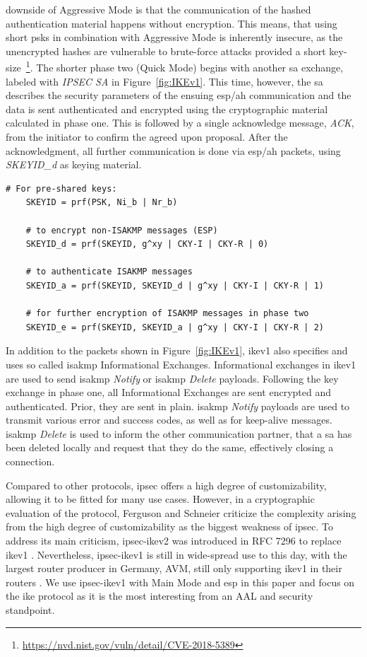 downside of Aggressive Mode is that the communication of the hashed authentication material happens without encryption. This means, that using short \acp{psk} in combination with Aggressive Mode is inherently insecure, as the unencrypted hashes are vulnerable to brute-force attacks provided a short key-size~\footnote{\url{https://nvd.nist.gov/vuln/detail/CVE-2018-5389}}. The shorter phase two (Quick Mode) begins with another \ac{sa} exchange, labeled with \emph{IPSEC SA} in Figure~\ref{fig:IKEv1}. This time, however, the \ac{sa} describes the security parameters of the ensuing \ac{esp}/\ac{ah} communication and the data is sent authenticated and encrypted using the cryptographic material calculated in phase one. This is followed by a single acknowledge message, \emph{ACK}, from the initiator to confirm the agreed upon proposal. After the acknowledgment, all further communication is done via \ac{esp}/\ac{ah} packets, using \emph{SKEYID\_d} as keying material.

\begin{lstlisting}[float=ht, caption=IKE Keying, label=lst:keying]
	# For pre-shared keys: 
	SKEYID = prf(PSK, Ni_b | Nr_b)
	
	# to encrypt non-ISAKMP messages (ESP)
	SKEYID_d = prf(SKEYID, g^xy | CKY-I | CKY-R | 0)
	
	# to authenticate ISAKMP messages
	SKEYID_a = prf(SKEYID, SKEYID_d | g^xy | CKY-I | CKY-R | 1)
	
	# for further encryption of ISAKMP messages in phase two
	SKEYID_e = prf(SKEYID, SKEYID_a | g^xy | CKY-I | CKY-R | 2)
\end{lstlisting}

In addition to the packets shown in Figure~\ref{fig:IKEv1}, \ac{ike}v1 also specifies and uses so called \ac{isakmp} Informational Exchanges. Informational exchanges in \ac{ike}v1 are used to send \ac{isakmp} \emph{Notify} or \ac{isakmp} \emph{Delete} payloads. Following the key exchange in phase one, all Informational Exchanges are sent encrypted and authenticated. Prior, they are sent in plain. \ac{isakmp} \emph{Notify} payloads are used to transmit various error and success codes, as well as for keep-alive messages. \ac{isakmp} \emph{Delete} is used to inform the other communication partner, that a \ac{sa} has been deleted locally and request that they do the same, effectively closing a connection. 

Compared to other protocols, \ac{ipsec} offers a high degree of customizability, allowing it to be fitted for many use cases. However, in a cryptographic evaluation of the protocol, Ferguson and Schneier \textcite{ferguson1999cryptographic} criticize the complexity arising from the high degree of customizability as the biggest weakness of \ac{ipsec}. To address its main criticism, \ac{ipsec}-\ac{ike}v2 was introduced in RFC 7296 to replace \ac{ike}v1 \cite{kaufman2014internet}. Nevertheless, \ac{ipsec}-\ac{ike}v1 is still in wide-spread use to this day, with the largest router producer in Germany, AVM, still only supporting \ac{ike}v1 in their routers \cite{avm2022}. We use \ac{ipsec}-\ac{ike}v1 with Main Mode and \ac{esp} in this paper and focus on the \ac{ike} protocol as it is the most interesting from an AAL and security standpoint. %
